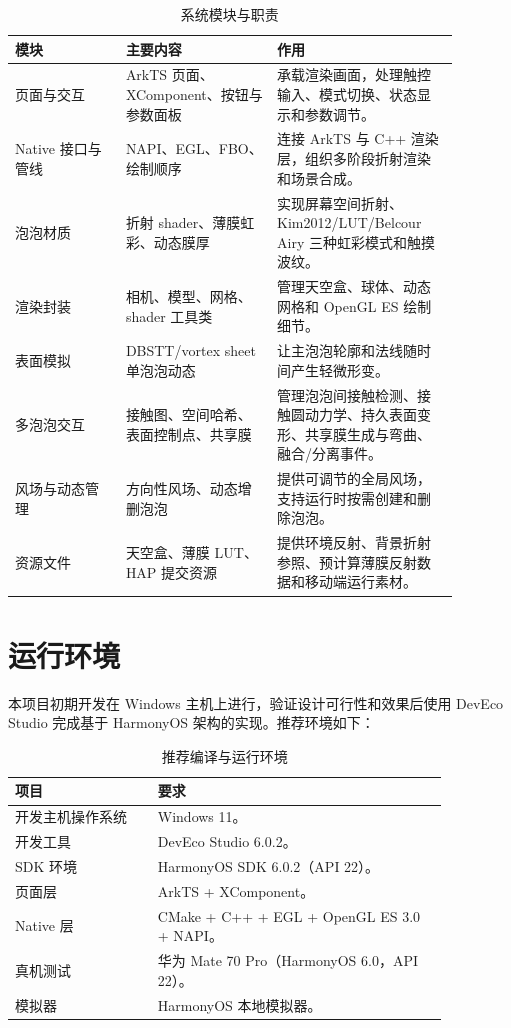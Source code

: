 \begin{table}[H]
  \centering
  \caption{系统模块与职责}
  \label{tab:structure}
  \begin{tabular}{p{0.22\linewidth}p{0.30\linewidth}p{0.36\linewidth}}
    \toprule
    模块 & 主要内容 & 作用 \\
    \midrule
    页面与交互 & ArkTS 页面、XComponent、按钮与参数面板 & 承载渲染画面，处理触控输入、模式切换、状态显示和参数调节。\\
    Native 接口与管线 & NAPI、EGL、FBO、绘制顺序 & 连接 ArkTS 与 C++ 渲染层，组织多阶段折射渲染和场景合成。\\
    泡泡材质 & 折射 shader、薄膜虹彩、动态膜厚 & 实现屏幕空间折射、Kim2012/LUT/Belcour Airy 三种虹彩模式和触摸波纹。\\
    渲染封装 & 相机、模型、网格、shader 工具类 & 管理天空盒、球体、动态网格和 OpenGL ES 绘制细节。\\
    表面模拟 & DBSTT/vortex sheet 单泡泡动态 & 让主泡泡轮廓和法线随时间产生轻微形变。\\
    \midrule
    多泡泡交互 & 接触图、空间哈希、表面控制点、共享膜 & 管理泡泡间接触检测、接触圆动力学、持久表面变形、共享膜生成与弯曲、融合/分离事件。\\
    风场与动态管理 & 方向性风场、动态增删泡泡 & 提供可调节的全局风场，支持运行时按需创建和删除泡泡。\\
    资源文件 & 天空盒、薄膜 LUT、HAP 提交资源 & 提供环境反射、背景折射参照、预计算薄膜反射数据和移动端运行素材。\\
    \bottomrule
  \end{tabular}
\end{table}

\section{运行环境}

本项目初期开发在 Windows 主机上进行，验证设计可行性和效果后使用 DevEco Studio 完成基于 HarmonyOS 架构的实现。推荐环境如下：

\begin{table}[H]
  \centering
  \caption{推荐编译与运行环境}
  \begin{tabular}{p{0.28\linewidth}p{0.58\linewidth}}
    \toprule
    项目 & 要求 \\
    \midrule
    开发主机操作系统 & Windows 11。\\
    开发工具 & DevEco Studio 6.0.2。\\
    SDK 环境 & HarmonyOS SDK 6.0.2（API 22）。\\
    页面层 & ArkTS + XComponent。\\
    Native 层 & CMake + C++ + EGL + OpenGL ES 3.0 + NAPI。\\
    真机测试 & 华为 Mate 70 Pro（HarmonyOS 6.0，API 22）。\\
    模拟器 & HarmonyOS 本地模拟器。\\
    \bottomrule
  \end{tabular}
\end{table}

